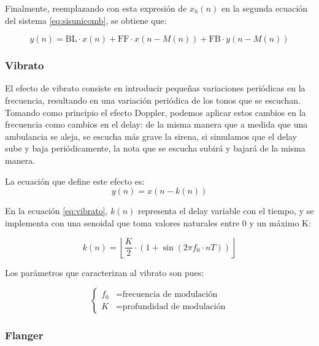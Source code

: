 \documentclass[assd_tp2_main.tex]{subfiles}
\begin{document}
Finalmente, reemplazando con esta expresi\'on de $x_h(n)$  en la segunda ecuaci\'on del sistema \ref{eq:sisunicomb}, se obtiene que:

\begin{equation}
	y(n) = \text{BL} \cdot x(n) + 
	\text{FF} \cdot x(n-M(n)) + \text{FB} \cdot y(n-M(n)) 
\end{equation}


\subsubsection{Vibrato}

El efecto de vibrato consiste en introducir peque\~nas variaciones peri\'odicas en la frecuencia, resultando en una variaci\'on peri\'odica de los tonos que se escuchan. Tomando como principio el efecto Doppler, podemos aplicar estos cambios en la frecuencia como cambios en el delay: de la misma manera que a medida que una ambulancia se aleja, se escucha m\'as grave  la sirena, si simulamos que el delay sube y baja peri\'odicamente, la nota que se escucha subir\'a y bajar\'a de la misma manera.

La ecuaci\'on que define este efecto es:
\begin{equation}
	y(n) = x\left(n - k(n) \right)
	\label{eq:vibrato}
\end{equation}

En la ecuaci\'on \ref{eq:vibrato}, $k(n)$ representa el delay variable con el tiempo, y se implementa con una senoidal que toma valores naturales entre 0 y un m\'aximo K:

\begin{equation}
	k(n) = \left \lfloor \frac{K}{2} \cdot 
		\left( 1 + \sin{\left(2\pi f_0 \cdot nT\right)} \right) \right \rfloor
		\label{eq:k(n)}
\end{equation}

Los par\'ametros que caracterizan al vibrato son pues:

\begin{equation}
	\left\{
	\begin{aligned}
		f_0	&= \text{frecuencia de modulaci\'on} \\
		K   	&= \text{profundidad de modulaci\'on}
	\end{aligned}	
	\right.
\end{equation}





\subsubsection{Flanger}
\end{document}
